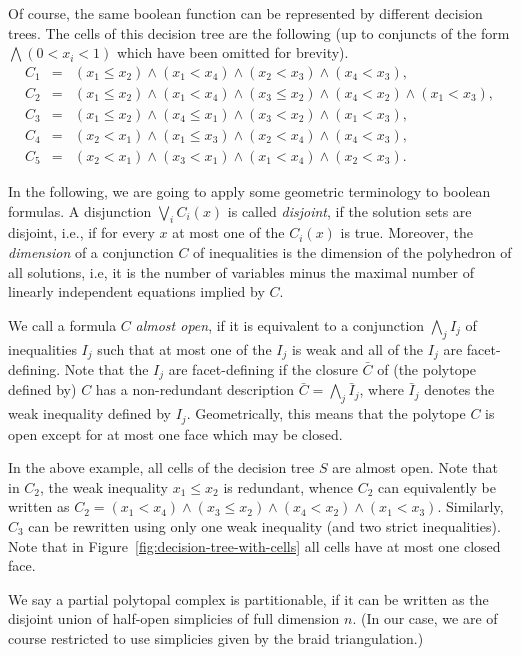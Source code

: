 \documentclass[12pt,reqno]{amsart}
\numberwithin{definition}{section}
\theoremstyle{definition}
\begin{document}
Of course, the same boolean function can be represented by different decision trees. The cells of this decision tree are the following (up to conjuncts of the form $\bigwedge (0 < x_i <1)$ which have been omitted for brevity).
\begin{align*}
C_1 &=& (x_1\leq x_2) \wedge (x_1 < x_4) \wedge (x_2 < x_3) \wedge (x_4 < x_3), \\
C_2 &=& (x_1\leq x_2) \wedge (x_1 < x_4) \wedge (x_3 \leq x_2) \wedge (x_4 < x_2) \wedge (x_1 < x_3), \\
C_3 &=& (x_1\leq x_2) \wedge (x_4 \leq x_1) \wedge (x_3 < x_2) \wedge (x_1 < x_3), \\
C_4 &=& (x_2 < x_1) \wedge (x_1 \leq x_3) \wedge (x_2 < x_4) \wedge (x_4 < x_3), \\
C_5 &=& (x_2 < x_1) \wedge (x_3 < x_1) \wedge (x_1 < x_4) \wedge (x_2 < x_3).
\end{align*}

In the following, we are going to apply some geometric terminology to boolean formulas. A disjunction $\bigvee_i C_i(x)$ is called \emph{disjoint}, if the solution sets are disjoint, i.e., if for every $x$ at most one of the $C_i(x)$ is true. Moreover, the \emph{dimension} of a conjunction $C$ of inequalities is the dimension of the polyhedron of all solutions, i.e, it is the number of variables minus the maximal number of linearly independent equations implied by $C$.

We call a formula $C$ \emph{almost open}, if it is equivalent to a conjunction $\bigwedge_j I_{j}$ of inequalities $I_j$ such that at most one of the $I_j$ is weak and all of the $I_j$ are facet-defining. Note that the $I_j$ are facet-defining if the closure $\bar{C}$ of (the polytope defined by) $C$ has a non-redundant description $\bar{C} = \bigwedge_j \bar{I}_j$, where $\bar{I}_j$ denotes the weak inequality defined by $I_j$. Geometrically, this means that the polytope $C$ is open except for at most one face which may be closed.

In the above example, all cells of the decision tree $S$ are almost open. Note that in $C_2$, the weak inequality $x_1 \leq x_2$ is redundant, whence $C_2$ can equivalently be written as $C_2 = (x_1 < x_4) \wedge (x_3 \leq x_2) \wedge (x_4 < x_2) \wedge (x_1 < x_3)$. Similarly, $C_3$ can be rewritten using only one weak inequality (and two strict inequalities). Note that in Figure~\ref{fig:decision-tree-with-cells} all cells have at most one closed face.

We say a partial polytopal complex is partitionable, if it can be written as the disjoint union of half-open simplicies of full dimension $n$. (In our case, we are of course restricted to use simplicies given by the braid triangulation.)
\end{document}
